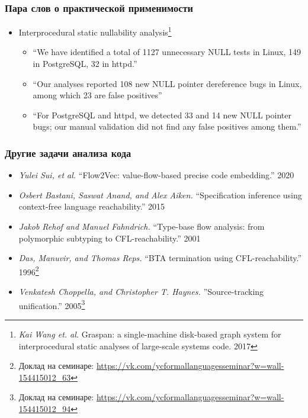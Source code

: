 \documentclass{beamer}
\begin{document}
\begin{frame}[fragile]
  
  \frametitle{Пара слов о практической применимости}
  \begin{itemize} 
\item Interprocedural static nullability analysis\footnote{\emph{Kai Wang et. al.} Graspan: a single-machine disk-based graph system for interprocedural static analyses of large-scale systems code. 2017}
  
\begin{itemize} 
   \item ``We have identified a total of 1127 unnecessary NULL tests in Linux, 149 in PostgreSQL, 
   32 in httpd.''
   \item ``Our analyses reported 108 new NULL pointer dereference bugs in Linux, among which 23 are false positives''
   \item ``For PostgreSQL and httpd, we detected 33 and 14 new NULL pointer bugs; our manual validation did not find any false positives among them.''
\end{itemize}

\end{itemize}

\end{frame}


\begin{frame}[fragile]
  
  \frametitle{Другие задачи анализа кода}
  \begin{itemize}
    \item \emph{Yulei Sui, et al.} ``Flow2Vec: value-flow-based precise code embedding.'' 2020 
    \pause
    \item \emph{Osbert Bastani, Saswat Anand, and Alex Aiken.} ``Specification inference using context-free language reachability.'' 2015
    \item \emph{Jakob Rehof and Manuel Fahndrich.} ``Type-base flow analysis: from polymorphic subtyping to CFL-reachability.'' 2001
    \pause
    \item \emph{Das, Manuvir, and Thomas Reps.} ``BTA termination using CFL-reachability.'' 1996\footnote{Доклад на семинаре: \url{https://vk.com/ycformallanguagesseminar?w=wall-154415012_63}}
    \pause
    \item \emph{Venkatesh Choppella, and Christopher T. Haynes.} ''Source-tracking unification.'' 2005\footnote{Доклад на семинаре: \url{https://vk.com/ycformallanguagesseminar?w=wall-154415012_94}}
  \end{itemize}

\end{frame}
\end{document}
